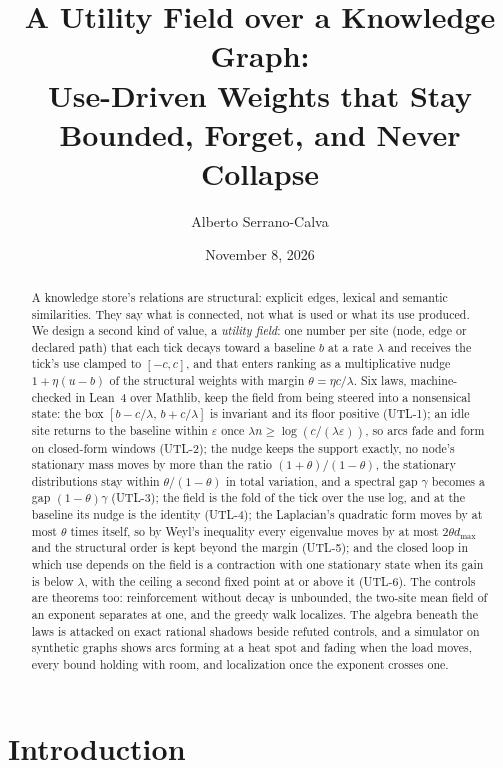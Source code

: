 \documentclass[11pt,a4paper]{article}
\title{A Utility Field over a Knowledge Graph:\\
Use-Driven Weights that Stay Bounded, Forget, and Never Collapse}
\author{Alberto Serrano-Calva}
\date{November 8, 2026}
\theoremstyle{plain}
\theoremstyle{definition}
\begin{document}
\maketitle

\begin{abstract}
A knowledge store's relations are structural: explicit edges, lexical and semantic similarities.
They say what is connected, not what is used or what its use produced. We design a second kind of
value, a \emph{utility field}: one number per site (node, edge or declared path) that each tick
decays toward a baseline $b$ at a rate $\lambda$ and receives the tick's use clamped to $[-c, c]$,
and that enters ranking as a multiplicative nudge $1 + \eta(u - b)$ of the structural weights with
margin $\theta = \eta c/\lambda$. Six laws, machine-checked in Lean~4 over Mathlib, keep the field
from being steered into a nonsensical state: the box $[b - c/\lambda,\, b + c/\lambda]$ is
invariant and its floor positive (UTL-1); an idle site returns to the baseline within $\varepsilon$
once $\lambda n \ge \log(c/(\lambda\varepsilon))$, so arcs fade and form on closed-form windows
(UTL-2); the nudge keeps the support exactly, no node's stationary mass moves by more than the
ratio $(1+\theta)/(1-\theta)$, the stationary distributions stay within $\theta/(1-\theta)$ in total
variation, and a spectral gap $\gamma$ becomes a gap $(1-\theta)\gamma$ (UTL-3); the field is the
fold of the tick over the use log, and at the baseline its nudge is the identity (UTL-4); the
Laplacian's quadratic
form moves by at most $\theta$ times itself, so by Weyl's inequality every eigenvalue moves by at
most $2\theta d_{\max}$ and the structural order is kept beyond the margin (UTL-5); and the closed
loop in which use depends on the field is a contraction with one stationary state when its gain is
below $\lambda$, with the ceiling a second fixed point at or above it (UTL-6). The controls are
theorems too: reinforcement without decay is unbounded, the two-site mean field of an exponent
separates at one, and the greedy walk localizes. The algebra beneath the laws is attacked on exact
rational shadows beside refuted controls, and a simulator on synthetic graphs shows arcs forming at
a heat spot and fading when the load moves, every bound holding with room, and localization once
the exponent crosses one.
\end{abstract}

\section{Introduction}
\end{document}
